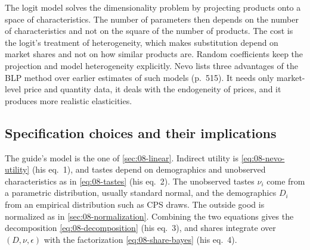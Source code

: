 The logit model solves the dimensionality problem by projecting products onto a space of
characteristics. The number of parameters then depends on the number of characteristics and not on the
square of the number of products. The cost is the logit's treatment of heterogeneity, which makes
substitution depend on market shares and not on how similar products are. Random coefficients keep the
projection and model heterogeneity explicitly. Nevo lists three advantages of the BLP method over earlier
estimates of such models (p.~515). It needs only market-level price and quantity data, it deals with the
endogeneity of prices, and it produces more realistic elasticities.

\subsection{Specification choices and their implications}\label{sec:08-nevo00-spec}

The guide's model is the one of \cref{sec:08-linear}. Indirect utility is \eqref{eq:08-nevo-utility} (his
eq.~1), and tastes depend on demographics and unobserved characteristics as in \eqref{eq:08-tastes} (his
eq.~2). The unobserved tastes $\nu_i$ come from a parametric distribution, usually standard normal, and the
demographics $D_i$ from an empirical distribution such as CPS draws. The outside good is normalized as in \cref{sec:08-normalization}. Combining the
two equations gives the decomposition \eqref{eq:08-decomposition} (his eq.~3), and shares integrate over
$(D,\nu,\epsilon)$ with the factorization \eqref{eq:08-share-bayes} (his eq.~4).

